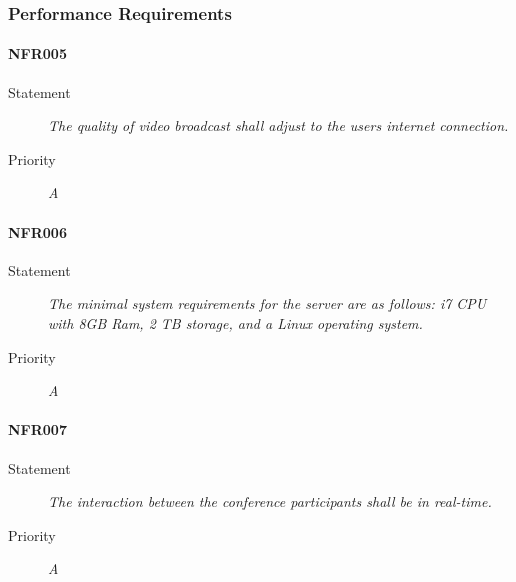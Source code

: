 \subsubsection{Performance Requirements}

\paragraph{NFR005}
\begin{description}
\item[Statement] \textit{The quality of video broadcast shall adjust to the
    users internet connection.}
\item[Priority] \textit{A}
\end{description}

\paragraph{NFR006}
\begin{description}
\item[Statement] \textit{The minimal system requirements for the server are as
    follows: i7 CPU with 8GB Ram, 2 TB storage, and a Linux operating
    system.}
\item[Priority] \textit{A}
\end{description}

\paragraph{NFR007}
\begin{description}
\item[Statement] \textit{The interaction between the conference participants
    shall be in real-time.}
\item[Priority] \textit{A}
\end{description}